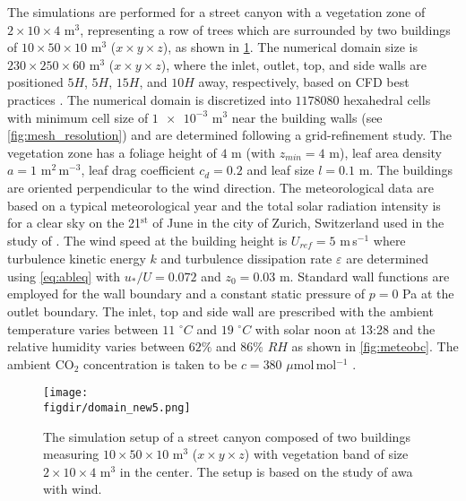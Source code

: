 The simulations are performed for a street canyon with a vegetation zone of $2 \times 10 \times 4$ m$^3$, representing a row of trees which are surrounded by two buildings of $10 \times 50 \times 10$ m$^3$ ($x\times y \times z$), as shown in \cref{fig:domain_new5}. The numerical domain size is $230\times 250 \times 60$ m$^3$  ($x\times y \times z$), where the inlet, outlet, top, and side walls are positioned $5 H$, $5 H$, $15 H$, and $10 H$ away, respectively, based on CFD best practices \citep{Blocken2015, Franke2007, Tominaga2008}. The numerical domain is discretized into $\num{1178080}$ hexahedral cells with minimum cell size of $\num{1e-3}$ m$^{3}$ near the building walls (see \cref{fig:mesh_resolution}) and are determined following a grid-refinement study. The vegetation zone has a foliage height of $4$ m (with $z_{\textit{min}}= 4$ m), leaf area density $a= 1$ m$^2$\,m$^{-3}$, leaf drag coefficient $c_d=0.2$ and leaf size $l=0.1$ m. The buildings are oriented perpendicular to the wind direction. The meteorological data are based on a typical meteorological year and the total solar radiation intensity is for a clear sky on the 21$^{\mathrm{st}}$ of June in the city of Zurich, Switzerland used in the study of \cite{Kubilay2018}.  The wind speed at the building height is $U_{\textit{ref}}=5$ m\,s$^{-1}$  where turbulence kinetic energy $k$ and turbulence dissipation rate $\varepsilon$ are determined using \cref{eq:ableq} \citep{Richards1993} with $u_*/U = 0.072$ and $z_0 = 0.03$ m. Standard wall functions are employed for the wall boundary and a constant static pressure of $p=0$ Pa at the outlet boundary. The inlet, top and side wall are prescribed with the ambient temperature varies between $11$ $^{\circ}C$ and $19$ $^{\circ}C$ with solar noon at 13:28 and the relative humidity varies between $62\%$ and $86\%$ $RH$ as shown in \cref{fig:meteobc}. The ambient CO$_2$ concentration is taken to be $c=380$ $\mu$mol\,mol$^{-1}$ .

	\begin{figure}[t]
	\centering
	\texttt{[image: \\figdir/domain\_new5.png]}
	\caption{The simulation setup of a street canyon composed of two buildings measuring $10 \times 50 \times 10$ m$^3$ ($x\times y \times z$) with vegetation band of size $2 \times 10 \times 4$ m$^3$ in the center. The setup is based on the study of \cite{Kubilay2018} awa with wind.}
	\label{fig:domain_new5}
	\end{figure}


